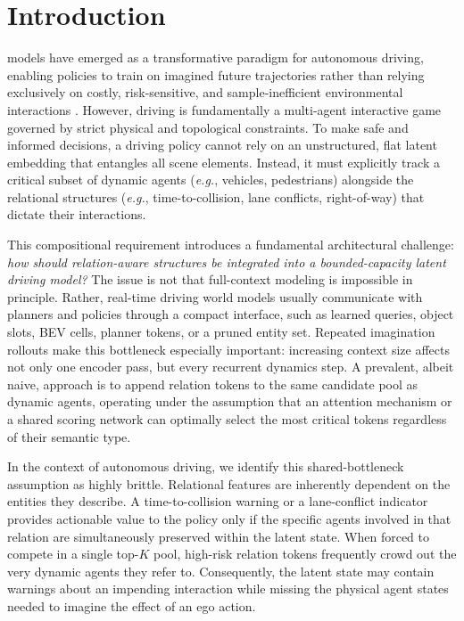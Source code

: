 \documentclass[10pt,journal,compsoc]{IEEEtran}
\begin{document}
\section{Introduction}
 models have emerged as a transformative paradigm for autonomous driving, enabling policies to train on imagined future trajectories rather than relying exclusively on costly, risk-sensitive, and sample-inefficient environmental interactions \cite{ha2018worldmodels,hafner2025dreamerv3}. However, driving is fundamentally a multi-agent interactive game governed by strict physical and topological constraints. To make safe and informed decisions, a driving policy cannot rely on an unstructured, flat latent embedding that entangles all scene elements. Instead, it must explicitly track a critical subset of dynamic agents (\textit{e.g.}, vehicles, pedestrians) alongside the relational structures (\textit{e.g.}, time-to-collision, lane conflicts, right-of-way) that dictate their interactions. 

This compositional requirement introduces a fundamental architectural challenge: \emph{how should relation-aware structures be integrated into a bounded-capacity latent driving model?} The issue is not that full-context modeling is impossible in principle. Rather, real-time driving world models usually communicate with planners and policies through a compact interface, such as learned queries, object slots, BEV cells, planner tokens, or a pruned entity set. Repeated imagination rollouts make this bottleneck especially important: increasing context size affects not only one encoder pass, but every recurrent dynamics step. A prevalent, albeit naive, approach is to append relation tokens to the same candidate pool as dynamic agents, operating under the assumption that an attention mechanism or a shared scoring network can optimally select the most critical tokens regardless of their semantic type.

In the context of autonomous driving, we identify this shared-bottleneck assumption as highly brittle. Relational features are inherently dependent on the entities they describe. A time-to-collision warning or a lane-conflict indicator provides actionable value to the policy only if the specific agents involved in that relation are simultaneously preserved within the latent state. When forced to compete in a single top-$K$ pool, high-risk relation tokens frequently crowd out the very dynamic agents they refer to. Consequently, the latent state may contain warnings about an impending interaction while missing the physical agent states needed to imagine the effect of an ego action.
\end{document}
